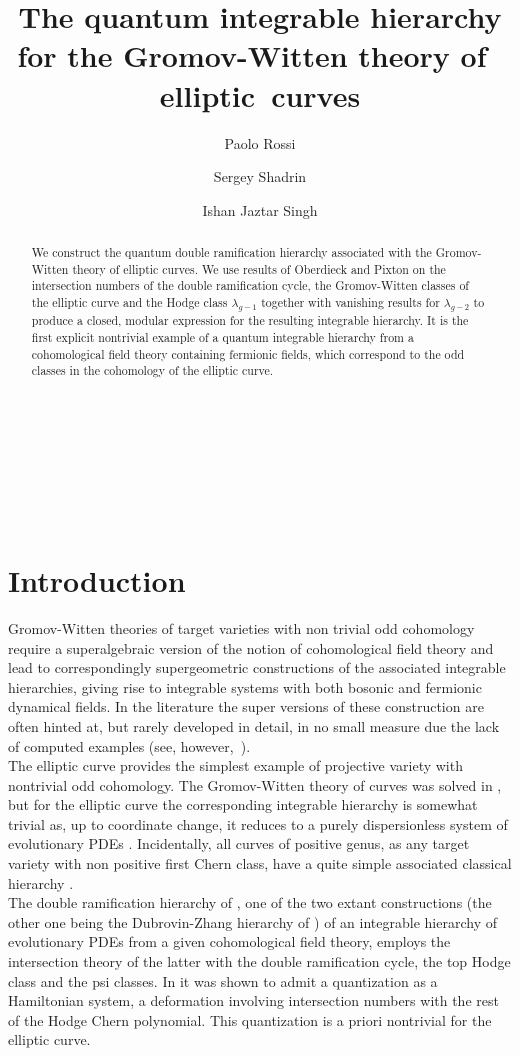 \documentclass{amsart}
\title{The quantum integrable hierarchy for the Gromov-Witten theory of~ elliptic~curves}
\author{Paolo Rossi}
\author{Sergey Shadrin}
\author{Ishan Jaztar Singh}
\numberwithin{equation}{section} %
\theoremstyle{plain}
\theoremstyle{remark}
\begin{document}
﻿
\begin{abstract}
We construct the quantum double ramification hierarchy associated with the Gromov-Witten theory of elliptic curves. We use results of Oberdieck and Pixton on the intersection numbers of the double ramification cycle, the Gromov-Witten classes of the elliptic curve and the Hodge class $\lambda_{g-1}$ together with vanishing results for $\lambda_{g-2}$ to produce a closed, modular expression for the resulting integrable hierarchy. It is the first explicit nontrivial example of a quantum integrable hierarchy from a cohomological field theory containing fermionic fields, which correspond to the odd classes in the cohomology of the elliptic curve.
\end{abstract}
﻿
\maketitle
﻿
\tableofcontents
﻿
\section*{Introduction}

Gromov-Witten theories of target varieties with non trivial odd cohomology require a superalgebraic version of the notion of cohomological field theory \cite{kontsevich_manin_1994} and lead to correspondingly supergeometric constructions of the associated integrable hierarchies, giving rise to integrable systems with both bosonic and fermionic dynamical fields. In the literature the super versions of these construction are often hinted at, but rarely developed in detail, in no small measure due the lack of computed examples (see, however,~\cite{DSVV}).\\

The elliptic curve provides the simplest example of projective variety with nontrivial odd cohomology. The Gromov-Witten theory of curves was solved in \cite{okounkov_pandharipande_06_a,okounkov_pandharipande_06_b, okounkov_pandharipande_06_c}, but for the elliptic curve the corresponding integrable hierarchy is somewhat trivial as, up to coordinate change, it reduces to a purely dispersionless system of evolutionary PDEs  \cite{buryak_22}. Incidentally, all curves of positive genus, as any target variety with non positive first Chern class, have a quite simple associated classical hierarchy \cite{buryak_dubrovin_guéré_rossi_18}.\\

The double ramification hierarchy of \cite{buryak_15}, one of the two extant constructions (the other one being the Dubrovin-Zhang hierarchy of \cite{dubrovin_zhang_01,buryak_posthuma_shadrin_12}) of an integrable hierarchy of evolutionary PDEs from a given cohomological field theory, employs the intersection theory of the latter with the double ramification cycle, the top Hodge class and the psi classes. In \cite{buryak_rossi_15} it was shown to admit a quantization as a Hamiltonian system, a deformation involving intersection numbers with the rest of the Hodge Chern polynomial. This quantization is a priori nontrivial for the elliptic curve.\\
\end{document}
